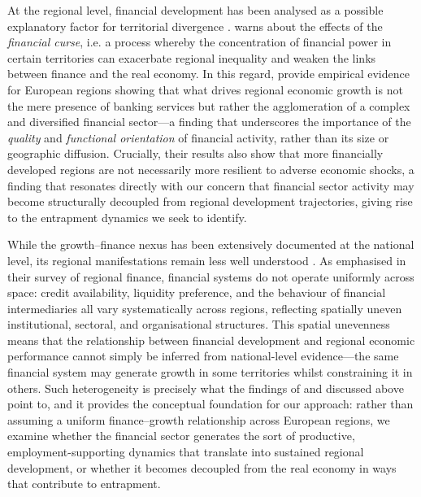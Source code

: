 \documentclass[a4paper,11pt,oneside]{article}
\begin{document}
At the regional level, financial development has been analysed as a possible explanatory factor for territorial divergence \citep{aghion2005effect,badunenko2013financial}. \cite{sokol2017financialisation} warns about the effects of the \textit{financial curse}, i.e. a process whereby the concentration of financial power in certain territories can exacerbate regional inequality and weaken the links between finance and the real economy. In this regard, \cite{rossi2021financial} provide empirical evidence for European regions showing that what drives regional economic growth is not the mere presence of banking services but rather the agglomeration of a complex and diversified financial sector---a finding that underscores the importance of the \textit{quality} and \textit{functional orientation} of financial activity, rather than its size or geographic diffusion. Crucially, their results also show that more financially developed regions are not necessarily more resilient to adverse economic shocks, a finding that resonates directly with our concern that financial sector activity may become structurally decoupled from regional development trajectories, giving rise to the entrapment dynamics we seek to identify.






While the growth–finance nexus has been extensively documented at the national level, its regional manifestations remain less well understood \citep{wojcik2025finance}. As \cite{dow1997regional} emphasised in their survey of regional finance, financial systems do not operate uniformly across space: credit availability, liquidity preference, and the behaviour of financial intermediaries all vary systematically across regions, reflecting spatially uneven institutional, sectoral, and organisational structures. This spatial unevenness means that the relationship between financial development and regional economic performance cannot simply be inferred from national-level evidence---the same financial system may generate growth in some territories whilst constraining it in others. Such heterogeneity is precisely what the findings of \cite{rossi2021financial} and \cite{sokol2017financialisation} discussed above point to, and it provides the conceptual foundation for our approach: rather than assuming a uniform finance–growth relationship across European regions, we examine whether the financial sector generates the sort of productive, employment-supporting dynamics that translate into sustained regional development, or whether it becomes decoupled from the real economy in ways that contribute to entrapment.
\end{document}
